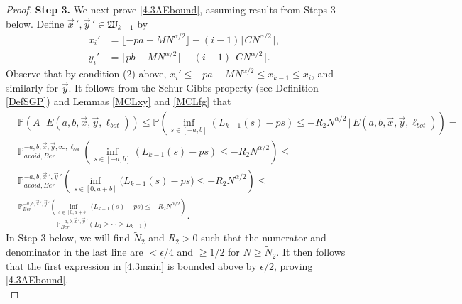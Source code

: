 \begin{proof}
		\noindent\textbf{Step 3.} We next prove \eqref{4.3AEbound}, assuming results from Steps 3 below. Define $\vec{x}\,',\vec{y}\,' \in \mathfrak{W}_{k-1}$ by
		\begin{align*}
		x_i' &= \lfloor - pa - MN^{\alpha/2}\rfloor - (i-1)\lceil CN^{\alpha/2}\rceil,\\
		y_i' &= \lfloor pb - MN^{\alpha/2}\rfloor - (i-1)\lceil CN^{\alpha/2}\rceil.
		\end{align*}  
		Observe that by condition (2) above, $x_i'\leq -pa - MN^{\alpha/2} \leq x_{k-1} \leq x_i$, and similarly for $\vec{y}$. It follows from the Schur Gibbs property (see Definition \ref{DefSGP}) and Lemmas \ref{MCLxy} and \ref{MCLfg} that
		\begin{equation}\label{4.3main}
		\begin{split}
		&\mathbb{P}(A\,|\,E(a,b,\vec{x},\vec{y},\ell_{bot})) \leq \mathbb{P}\left( \inf_{s\in[-a, b]} \left(L_{k-1}(s) - ps\right) \leq -R_2N^{\alpha/2}\, \big| \, E(a,b,\vec{x},\vec{y},\ell_{bot}) \right) = \\
		&\mathbb{P}^{-a,b, \vec{x}, \vec{y},\infty,\ell_{bot}}_{avoid, Ber} \left( \inf_{s\in[-a, b]} \left(L_{k-1}(s) - ps\right) \leq -R_2N^{\alpha/2} \right) \leq\\
		& \mathbb{P}^{-a, b, \vec{x}\,', \vec{y}\,'}_{avoid, Ber} \left( \inf_{s\in[0,a+b]} \big(L_{k-1}(s) - ps\big) \leq -R_2N^{\alpha/2} \right) \leq \\
		&\frac{\mathbb{P}^{-a, b, \vec{x}\,', \vec{y}\,'}_{Ber} \left( \inf_{s\in[0,a+b]} \big(L_{k-1}(s) - ps\big) \leq -R_2 N^{\alpha/2} \right)}{\mathbb{P}^{-a, b, \vec{x}\,', \vec{y}\,'}_{Ber}(L_1 \geq \cdots \geq L_{k-1})}.
		\end{split}
		\end{equation}
		In Step 3 below, we will find $\tilde{N}_2$ and $R_2 > 0$ such that the numerator and denominator in the last line are $<\epsilon/4$ and $\geq1/2$ for $N\geq\tilde{N}_2$. It then follows that the first expression in \eqref{4.3main} is bounded above by $\epsilon/2$, proving \eqref{4.3AEbound}.\\
		

\end{proof}
